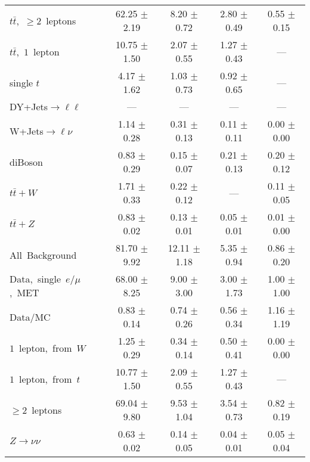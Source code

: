 \documentclass{article}
\begin{document}
\begin{longtable}{|l|c|c|c|c|}
$t\bar{t}$,~$\ge2$~leptons & 62.25 $\pm$ 2.19  & 8.20 $\pm$ 0.72  & 2.80 $\pm$ 0.49  & 0.55 $\pm$ 0.15 \\* 
$t\bar{t}$,~$1$~lepton & 10.75 $\pm$ 1.50  & 2.07 $\pm$ 0.55  & 1.27 $\pm$ 0.43  & --- \\* 
single $t$  & 4.17 $\pm$ 1.62  & 1.03 $\pm$ 0.73  & 0.92 $\pm$ 0.65  & --- \\* 
DY+Jets$\rightarrow\ell\ell$  & ---  & ---  & ---  & --- \\* 
W+Jets$\rightarrow\ell\nu$  & 1.14 $\pm$ 0.28  & 0.31 $\pm$ 0.13  & 0.11 $\pm$ 0.11  & 0.00 $\pm$ 0.00 \\* 
diBoson  & 0.83 $\pm$ 0.29  & 0.15 $\pm$ 0.07  & 0.21 $\pm$ 0.13  & 0.20 $\pm$ 0.12 \\* 
$t\bar{t}+W$  & 1.71 $\pm$ 0.33  & 0.22 $\pm$ 0.12  & ---  & 0.11 $\pm$ 0.05 \\* 
$t\bar{t}+Z$  & 0.83 $\pm$ 0.02  & 0.13 $\pm$ 0.01  & 0.05 $\pm$ 0.01  & 0.01 $\pm$ 0.00 \\* 
\hline \hline 
All~Background  & 81.70 $\pm$ 9.92  & 12.11 $\pm$ 1.18  & 5.35 $\pm$ 0.94  & 0.86 $\pm$ 0.20 \\* 
Data,~single~$e/\mu$,~MET  & 68.00 $\pm$ 8.25  & 9.00 $\pm$ 3.00  & 3.00 $\pm$ 1.73  & 1.00 $\pm$ 1.00 \\* 
Data/MC  & 0.83 $\pm$ 0.14  & 0.74 $\pm$ 0.26  & 0.56 $\pm$ 0.34  & 1.16 $\pm$ 1.19 \\* 
\hline \hline 
$1$~lepton,~from~$W$  & 1.25 $\pm$ 0.29  & 0.34 $\pm$ 0.14  & 0.50 $\pm$ 0.41  & 0.00 $\pm$ 0.00 \\* 
$1$~lepton,~from~$t$  & 10.77 $\pm$ 1.50  & 2.09 $\pm$ 0.55  & 1.27 $\pm$ 0.43  & --- \\* 
$\ge2$~leptons  & 69.04 $\pm$ 9.80  & 9.53 $\pm$ 1.04  & 3.54 $\pm$ 0.73  & 0.82 $\pm$ 0.19 \\* 
$Z\rightarrow\nu\nu$  & 0.63 $\pm$ 0.02  & 0.14 $\pm$ 0.05  & 0.04 $\pm$ 0.01  & 0.05 $\pm$ 0.04 \\* 
\hline 
\end{longtable} 

 
 
 
 
\pagebreak 

 
 
 
 
\end{document}
